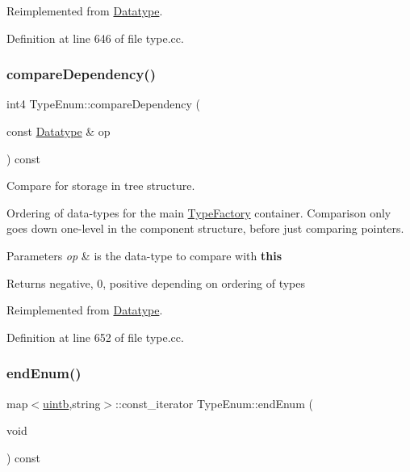 Reimplemented from \mbox{\hyperlink{class_datatype_a4d5a102b2d909180c3080fdb55d7b305}{Datatype}}.



Definition at line 646 of file type.\+cc.

\mbox{\label{class_type_enum_a593a6c9e7b9c3db7bbb3f590d8f3f202}} 
\subsubsection{\texorpdfstring{compareDependency()}{compareDependency()}}
{\footnotesize\ttfamily int4 Type\+Enum\+::compare\+Dependency (\begin{DoxyParamCaption}\item[{const \mbox{\hyperlink{class_datatype}{Datatype}} \&}]{op }\end{DoxyParamCaption}) const\hspace{0.3cm}{\ttfamily [virtual]}}



Compare for storage in tree structure. 

Ordering of data-\/types for the main \mbox{\hyperlink{class_type_factory}{Type\+Factory}} container. Comparison only goes down one-\/level in the component structure, before just comparing pointers. 
\begin{DoxyParams}{Parameters}
{\em op} & is the data-\/type to compare with {\bfseries{this}} \\
\hline
\end{DoxyParams}
\begin{DoxyReturn}{Returns}
negative, 0, positive depending on ordering of types 
\end{DoxyReturn}


Reimplemented from \mbox{\hyperlink{class_datatype_ab26e4ca2c3091d3c5a34b4fbd7be76ae}{Datatype}}.



Definition at line 652 of file type.\+cc.

\mbox{\label{class_type_enum_a60c142f090f378f3d79627d992fe5483}} 
\subsubsection{\texorpdfstring{endEnum()}{endEnum()}}
{\footnotesize\ttfamily map$<$\mbox{\hyperlink{types_8h_a2db313c5d32a12b01d26ac9b3bca178f}{uintb}},string$>$\+::const\+\_\+iterator Type\+Enum\+::end\+Enum (\begin{DoxyParamCaption}\item[{void}]{ }\end{DoxyParamCaption}) const\hspace{0.3cm}{\ttfamily [inline]}}



